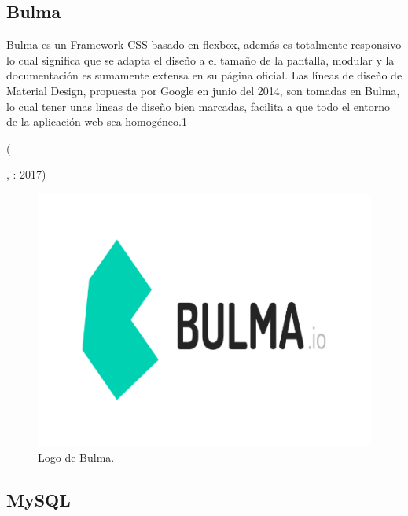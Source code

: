 \subsection{Bulma}

\begin{center}
  \begin{minipage}{0.9\linewidth}
    \vspace{5pt}%
    {\small
    Bulma es un Framework CSS basado en flexbox, además es totalmente responsivo lo cual significa que se adapta el diseño a el tamaño de la pantalla, modular y la documentación es sumamente extensa en su página oficial.
    Las líneas de diseño de Material Design, propuesta por Google en junio del 2014, son tomadas en Bulma, lo cual tener unas líneas de diseño bien marcadas, facilita a que todo el entorno de la aplicación web sea homogéneo.\ref{figura11}
    }
    \begin{flushright}
      (\author{Merino-Juárez, M.F., Alarcón-Gómez, M.G. y R. Lozano-Ascencio},
      : 2017)
    \end{flushright}
      \vspace{5pt}%
  \end{minipage}
\end{center}

\begin{figure}[h]
  \label{figura11}
  \centering
  \includegraphics[scale=1]{lib/assets/11}
  \caption{Logo de Bulma.}
\end{figure}

\subsection{MySQL}

